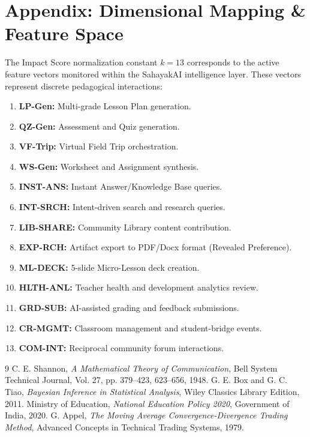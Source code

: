 \documentclass[11pt,a4paper]{article}
\begin{document}
\appendix
\section{Appendix: Dimensional Mapping \& Feature Space}
The Impact Score normalization constant $k=13$ corresponds to the active feature vectors monitored within the SahayakAI intelligence layer. These vectors represent discrete pedagogical interactions:
\begin{enumerate}
    \item \textbf{LP-Gen:} Multi-grade Lesson Plan generation.
    \item \textbf{QZ-Gen:} Assessment and Quiz generation.
    \item \textbf{VF-Trip:} Virtual Field Trip orchestration.
    \item \textbf{WS-Gen:} Worksheet and Assignment synthesis.
    \item \textbf{INST-ANS:} Instant Answer/Knowledge Base queries.
    \item \textbf{INT-SRCH:} Intent-driven search and research queries.
    \item \textbf{LIB-SHARE:} Community Library content contribution.
    \item \textbf{EXP-RCH:} Artifact export to PDF/Docx format (Revealed Preference).
    \item \textbf{ML-DECK:} 5-slide Micro-Lesson deck creation.
    \item \textbf{HLTH-ANL:} Teacher health and development analytics review.
    \item \textbf{GRD-SUB:} AI-assisted grading and feedback submissions.
    \item \textbf{CR-MGMT:} Classroom management and student-bridge events.
    \item \textbf{COM-INT:} Reciprocal community forum interactions.
\end{enumerate}

\begin{thebibliography}{9}
C. E. Shannon, \textit{A Mathematical Theory of Communication}, Bell System Technical Journal, Vol. 27, pp. 379--423, 623--656, 1948.
G. E. Box and G. C. Tiao, \textit{Bayesian Inference in Statistical Analysis}, Wiley Classics Library Edition, 2011.
Ministry of Education, \textit{National Education Policy 2020}, Government of India, 2020.
G. Appel, \textit{The Moving Average Convergence-Divergence Trading Method}, Advanced Concepts in Technical Trading Systems, 1979.
\end{thebibliography}
\end{document}
